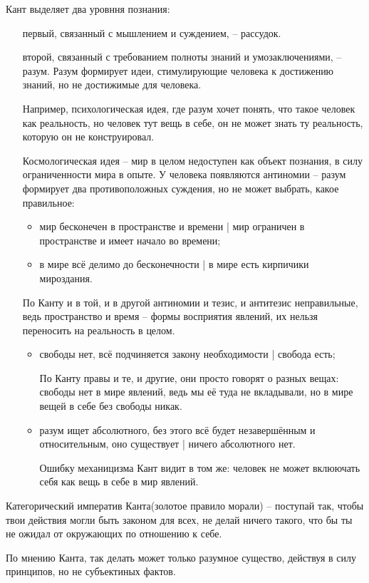 \documentclass[a4paper, 12pt]{book} %
\begin{document}
Кант выделяет два уровння познания:
\begin{itemize}
\item[первый,] связанный с мышлением и суждением, -- рассудок.
\item[второй,] связанный с требованием полноты знаний и умозаключениями, -- разум. Разум формирует идеи, стимулирующие человека к достижению знаний, но не достижимые для человека.

Например, психологическая идея, где разум хочет понять, что такое человек как реальность, но человек тут вещь в себе, он не может знать ту реальность, которую он не конструировал.

Космологическая идея -- мир в целом недоступен как объект познания, в силу ограниченности мира в опыте. У человека появляются антиномии -- разум формирует два противоположных суждения, но не может выбрать, какое правильное:
\begin{itemize}
\item мир бесконечен в пространстве и времени | мир ограничен в пространстве и имеет начало во времени;
\item в мире всё делимо до бесконечности | в мире есть кирпичики мироздания.
\end{itemize} 
По Канту и в той, и в другой антиномии и тезис, и антитезис неправильные, ведь пространство и время -- формы восприятия явлений, их нельзя переносить на реальность в целом.
\begin{itemize}
\item свободы нет, всё подчиняется закону необходимости | свобода есть;

По Канту правы и те, и другие, они просто говорят о разных вещах: свободы нет в мире явлений, ведь мы её туда не вкладывали, но в мире вещей в себе без свободы никак.

\item разум ищет абсолютного, без этого всё будет незавершённым и относительным, оно существует | ничего абсолютного нет.

Ошибку механицизма Кант видит в том же: человек не может вклюючать себя как вещь в себе в мир явлений. 
\end{itemize}
\end{itemize}

Категорический императив Канта(золотое правило морали) -- поступай так, чтобы твои действия могли быть законом для всех, не делай ничего такого, что бы ты не ожидал от окружающих по отношению к себе.

По мнению Канта, так делать может только разумное существо, действуя в силу принципов, но не субъектиных фактов.
\end{document}
